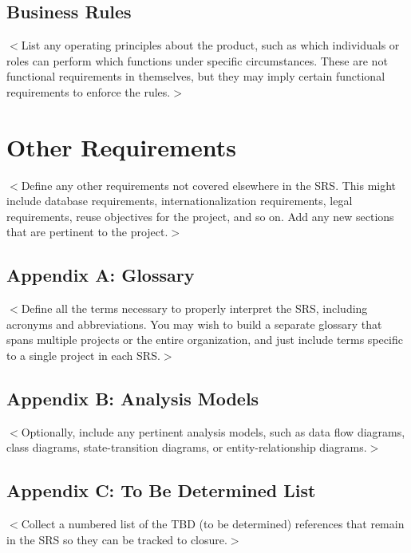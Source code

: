 \documentclass{scrreprt}
\begin{document}
\section{Business Rules}
$<$List any operating principles about the product, such as which individuals or 
roles can perform which functions under specific circumstances. These are not 
functional requirements in themselves, but they may imply certain functional 
requirements to enforce the rules.$>$


\chapter{Other Requirements}
$<$Define any other requirements not covered elsewhere in the SRS. This might 
include database requirements, internationalization requirements, legal 
requirements, reuse objectives for the project, and so on. Add any new sections 
that are pertinent to the project.$>$

\section{Appendix A: Glossary}
$<$Define all the terms necessary to properly interpret the SRS, including 
acronyms and abbreviations. You may wish to build a separate glossary that spans 
multiple projects or the entire organization, and just include terms specific to 
a single project in each SRS.$>$

\section{Appendix B: Analysis Models}
$<$Optionally, include any pertinent analysis models, such as data flow 
diagrams, class diagrams, state-transition diagrams, or entity-relationship 
diagrams.$>$

\section{Appendix C: To Be Determined List}
$<$Collect a numbered list of the TBD (to be determined) references that remain 
in the SRS so they can be tracked to closure.$>$
\end{document}
